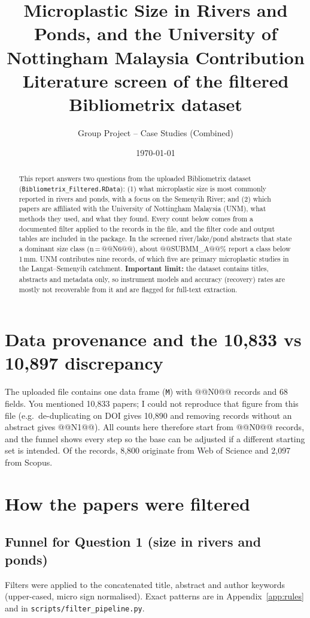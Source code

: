 \documentclass[11pt,a4paper]{article}
\title{\textbf{Microplastic Size in Rivers and Ponds, and the University of Nottingham Malaysia Contribution}\\[2pt]\large Literature screen of the filtered Bibliometrix dataset}
\author{Group Project -- Case Studies (Combined)}
\date{\today}
\newcommand{\flag}[1]{\textcolor{accent}{\textbf{#1}}}
\begin{document}
\maketitle

\begin{abstract}\noindent
This report answers two questions from the uploaded Bibliometrix dataset (\texttt{Bibliometrix\_\allowbreak Filtered.RData}): (1) what microplastic size is most commonly reported in rivers and ponds, with a focus on the Semenyih River; and (2) which papers are affiliated with the University of Nottingham Malaysia (UNM), what methods they used, and what they found. Every count below comes from a documented filter applied to the records in the file, and the filter code and output tables are included in the package. In the screened river/lake/pond abstracts that state a dominant size class (n\,=\,@@N6@@), about @@SUBMM_A@@\% report a class below 1\,mm. UNM contributes nine records, of which five are primary microplastic studies in the Langat--Semenyih catchment. \flag{Important limit:} the dataset contains titles, abstracts and metadata only, so instrument models and accuracy (recovery) rates are mostly not recoverable from it and are flagged for full-text extraction.
\end{abstract}

\section{Data provenance and the 10,833 vs 10,897 discrepancy}
The uploaded file contains one data frame (\texttt{M}) with @@N0@@ records and 68 fields. You mentioned 10,833 papers; I could not reproduce that figure from this file (e.g.\ de-duplicating on DOI gives 10,890 and removing records without an abstract gives @@N1@@). All counts here therefore start from @@N0@@ records, and the funnel shows every step so the base can be adjusted if a different starting set is intended. Of the records, 8,800 originate from Web of Science and 2,097 from Scopus.

\section{How the papers were filtered}
\subsection{Funnel for Question 1 (size in rivers and ponds)}
Filters were applied to the concatenated title, abstract and author keywords (upper-cased, micro sign normalised). Exact patterns are in Appendix~\ref{app:rules} and in \texttt{scripts/filter\_pipeline.py}.
\end{document}
